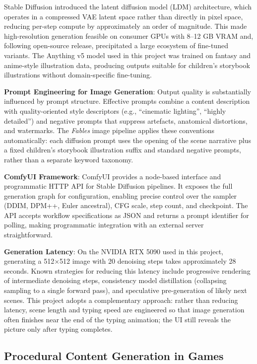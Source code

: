 \documentclass[12pt,a4paper]{article}
\begin{document}
Stable Diffusion \cite{rombach2022high} introduced the latent diffusion model (LDM) architecture, which operates in a compressed VAE latent space rather than directly in pixel space, reducing per-step compute by approximately an order of magnitude. This made high-resolution generation feasible on consumer GPUs with 8--12 GB VRAM and, following open-source release, precipitated a large ecosystem of fine-tuned variants. The Anything v5 model used in this project was trained on fantasy and anime-style illustration data, producing outputs suitable for children's storybook illustrations without domain-specific fine-tuning.

\textbf{Prompt Engineering for Image Generation}: Output quality is substantially influenced by prompt structure. Effective prompts combine a content description with quality-oriented style descriptors (e.g., ``cinematic lighting'', ``highly detailed'') and negative prompts that suppress artefacts, anatomical distortions, and watermarks. The \textit{Fables} image pipeline applies these conventions automatically: each diffusion prompt uses the opening of the scene narrative plus a fixed children's storybook illustration suffix and standard negative prompts, rather than a separate keyword taxonomy.

\textbf{ComfyUI Framework}: ComfyUI \cite{comfyui2024} provides a node-based interface and programmatic HTTP API for Stable Diffusion pipelines. It exposes the full generation graph for configuration, enabling precise control over the sampler (DDIM, DPM++, Euler ancestral), CFG scale, step count, and checkpoint. The API accepts workflow specifications as JSON and returns a prompt identifier for polling, making programmatic integration with an external server straightforward.

\textbf{Generation Latency}: On the NVIDIA RTX 5090 used in this project, generating a 512$\times$512 image with 20 denoising steps takes approximately 28 seconds. Known strategies for reducing this latency include progressive rendering of intermediate denoising steps, consistency model distillation (collapsing sampling to a single forward pass), and speculative pre-generation of likely next scenes. This project adopts a complementary approach: rather than reducing latency, scene length and typing speed are engineered so that image generation often finishes near the end of the typing animation; the UI still reveals the picture only after typing completes.

    \subsection{Procedural Content Generation in Games}
\end{document}
